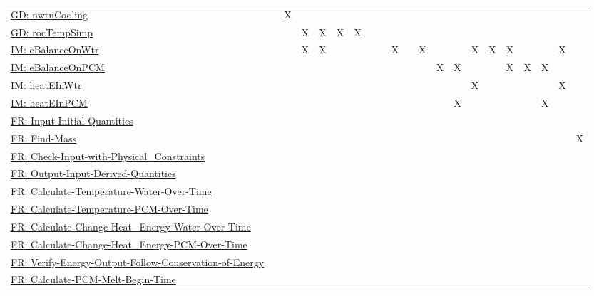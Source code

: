 \documentclass[12pt]{article}
\begin{document}
\begin{longtable}{l l l l l l l l l l l l l l l l l l l l l}
\\
\hyperref[GD:nwtnCooling]{GD: nwtnCooling} &  & X &  &  &  &  &  &  &  &  &  &  &  &  &  &  &  &  &  & 
\\
\hyperref[GD:rocTempSimp]{GD: rocTempSimp} &  &  & X & X & X & X &  &  &  &  &  &  &  &  &  &  &  &  &  & 
\\
\hyperref[IM:eBalanceOnWtr]{IM: eBalanceOnWtr} &  &  & X & X &  &  &  &  & X &  & X &  &  & X & X & X &  &  & X & 
\\
\hyperref[IM:eBalanceOnPCM]{IM: eBalanceOnPCM} &  &  &  &  &  &  &  &  &  &  &  & X & X &  &  & X & X & X &  & 
\\
\hyperref[IM:heatEInWtr]{IM: heatEInWtr} &  &  &  &  &  &  &  &  &  &  &  &  &  & X &  &  &  &  & X & 
\\
\hyperref[IM:heatEInPCM]{IM: heatEInPCM} &  &  &  &  &  &  &  &  &  &  &  &  & X &  &  &  &  & X &  & 
\\
\hyperref[inputInitQuants]{FR: Input-Initial-Quantities} &  &  &  &  &  &  &  &  &  &  &  &  &  &  &  &  &  &  &  & 
\\
\hyperref[findMass]{FR: Find-Mass} &  &  &  &  &  &  &  &  &  &  &  &  &  &  &  &  &  &  &  & X
\\
\hyperref[checkWithPhysConsts]{FR: Check-Input-with-Physical\_Constraints} &  &  &  &  &  &  &  &  &  &  &  &  &  &  &  &  &  &  &  & 
\\
\hyperref[outputInputDerivQuants]{FR: Output-Input-Derived-Quantities} &  &  &  &  &  &  &  &  &  &  &  &  &  &  &  &  &  &  &  & 
\\
\hyperref[calcTempWtrOverTime]{FR: Calculate-Temperature-Water-Over-Time} &  &  &  &  &  &  &  &  &  &  &  &  &  &  &  &  &  &  &  & 
\\
\hyperref[calcTempPCMOverTime]{FR: Calculate-Temperature-PCM-Over-Time} &  &  &  &  &  &  &  &  &  &  &  &  &  &  &  &  &  &  &  & 
\\
\hyperref[calcChgHeatEnergyWtrOverTime]{FR: Calculate-Change-Heat\_Energy-Water-Over-Time} &  &  &  &  &  &  &  &  &  &  &  &  &  &  &  &  &  &  &  & 
\\
\hyperref[calcChgHeatEnergyPCMOverTime]{FR: Calculate-Change-Heat\_Energy-PCM-Over-Time} &  &  &  &  &  &  &  &  &  &  &  &  &  &  &  &  &  &  &  & 
\\
\hyperref[verifyEnergyOutput]{FR: Verify-Energy-Output-Follow-Conservation-of-Energy} &  &  &  &  &  &  &  &  &  &  &  &  &  &  &  &  &  &  &  & 
\\
\hyperref[calcPCMMeltBegin]{FR: Calculate-PCM-Melt-Begin-Time} &  &  &  &  &  &  &  &  &  &  &  &  &  &  &  &  &  &  &  & 

\end{longtable}
\end{document}
